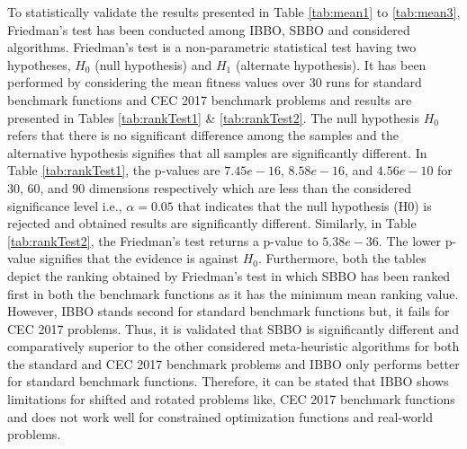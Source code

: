 To statistically validate the results presented in Table \ref{tab:mean1} to \ref{tab:mean3}, Friedman's test \cite{theodorsson1987} has been conducted among IBBO, SBBO and considered algorithms. Friedman’s test is a non-parametric statistical test having two hypotheses, $H_0$ (null hypothesis) and $H_1$ (alternate hypothesis). It has been performed by considering the mean fitness values over 30 runs for standard benchmark functions and CEC 2017 benchmark problems and results are presented in Tables \ref{tab:rankTest1} \& \ref{tab:rankTest2}.  The null hypothesis $H_0$ refers that there is no significant difference among the samples and the alternative hypothesis signifies that all samples are significantly different. In Table \ref{tab:rankTest1}, the p-values are  $7.45e-16$, $8.58e-16$, and $4.56e-10$ for $30$, $60$, and $90$ dimensions respectively which are less than the considered significance level i.e., $\alpha = 0.05$ that indicates that the null hypothesis (H0) is rejected and obtained results are significantly different. Similarly, in Table \ref{tab:rankTest2}, the Friedman's test returns a p-value to $5.38e-36$. The lower p-value signifies that the evidence is against $H_0$. Furthermore, both the tables depict the ranking obtained by Friedman's test in which SBBO has been ranked first in both the benchmark functions as it has the minimum mean ranking value. However, IBBO stands second for standard benchmark functions but, it fails for CEC 2017 problems. Thus, it is validated that SBBO is significantly different and comparatively superior to the other considered meta-heuristic algorithms for both the standard and CEC 2017 benchmark problems and IBBO only performs better for standard benchmark functions. Therefore, it can be stated that IBBO shows limitations for shifted and rotated problems like, CEC 2017 benchmark functions and does not work well for constrained optimization functions and real-world problems.  

